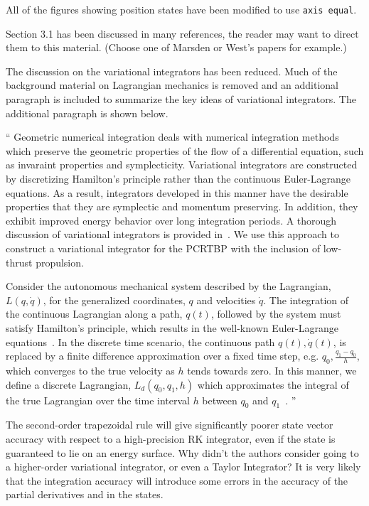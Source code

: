\documentclass[11pt]{article}
\newenvironment{correction}{\begin{list}{}{\setlength{\leftmargin}{1cm}\setlength{\rightmargin}{1cm}}\vspace{\parsep}\item[]``}{''\end{list}}
\begin{document}
\begin{enumerate}
All of the figures showing position states have been modified to use \texttt{axis equal}.

\item 
    \begin{itshape}
Section 3.1 has been discussed in many references, the reader may want to direct them to this material.
(Choose one of Marsden or West's papers for example.)
\end{itshape}

The discussion on the variational integrators has been reduced. 
Much of the background material on Lagrangian mechanics is removed and an additional paragraph is included to summarize the key ideas of variational integrators. 
The additional paragraph is shown below.

\begin{correction}
Geometric numerical integration deals with numerical integration methods which preserve the geometric properties of the flow of a differential equation, such as invaraint properties and symplecticity.
Variational integrators are constructed by discretizing Hamilton's principle rather than the continuous Euler-Lagrange equations.
As a result, integrators developed in this manner have the desirable properties that they are symplectic and momentum preserving.
In addition, they exhibit improved energy behavior over long integration periods.
A thorough discussion of variational integrators is provided in~\cite{west2004,marsden2001}.
We use this approach to construct a variational integrator for the PCRTBP with the inclusion of low-thrust propulsion.

Consider the autonomous mechanical system described by the Lagrangian, \( L(q, \dot{q} ) \), for the generalized coordinates, \( q\) and velocities \( \dot{q} \).
The integration of the continuous Lagrangian along a path, \( q (t) \), followed by the system must satisfy Hamilton's principle, which results in the well-known Euler-Lagrange equations~\cite{lanczos1970}.
In the discrete time scenario, the continuous path \( q(t), \dot{q}(t) \), is replaced by a finite difference approximation over a fixed time step, e.g. \( q_0, \frac{q_1 - q_0}{h} \), which converges to the true velocity as \( h \) tends towards zero.
In this manner, we define a discrete Lagrangian, \( L_d (q_0, q_1, h) \) which approximates the integral of the true Lagrangian over the time interval \( h \) between \( q_0 \) and \( q_1\)~\cite{marsden2001}.
\end{correction}

\item 
    \begin{itshape}
The second-order trapezoidal rule will give significantly poorer state vector accuracy with respect to a high-precision RK integrator, even if the state is guaranteed to lie on an energy surface.  Why didn't the authors consider going to a higher-order variational integrator, or even a Taylor Integrator?  It is very likely that the integration accuracy will introduce some errors in the accuracy of the partial derivatives and in the states.
\end{itshape}


\end{enumerate}
\end{document}
